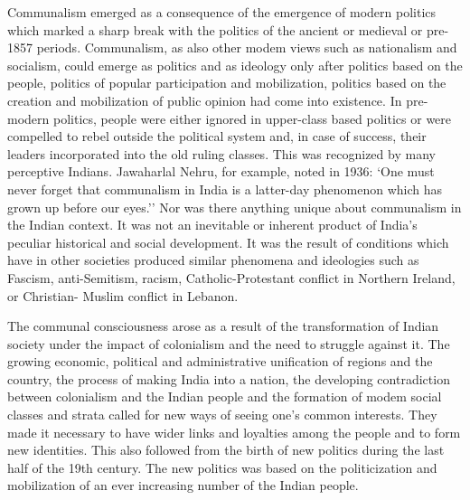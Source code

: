 \begin{multicols}{2}
Communalism emerged as a consequence of the emergence of modern politics which marked a sharp break with the politics of the ancient or medieval or pre-1857 periods. Communalism, as also other modem views such as nationalism and socialism, could emerge as politics and as ideology only after politics based on the people, politics of popular participation and mobilization, politics based on the creation and mobilization of public opinion had come into existence. In pre-modern politics, people were either ignored in upper-class based politics or were compelled to rebel outside the political system and, in case of success, their leaders incorporated into the old ruling classes. This was recognized by many perceptive Indians. Jawaharlal Nehru, for example, noted in 1936: `One must never forget that communalism in India is a latter-day phenomenon which has grown up before our eyes.'' Nor was there anything unique about communalism in the Indian context. It was not an inevitable or inherent product of India's peculiar historical and social development. It was the result of conditions which have in other societies produced similar phenomena and ideologies such as Fascism, anti-Semitism, racism, Catholic-Protestant conflict in Northern Ireland, or Christian- Muslim conflict in Lebanon. 

The communal consciousness arose as a result of the transformation of Indian society under the impact of colonialism and the need to struggle against it. The growing economic, political and administrative unification of regions and the country, the process of making India into a nation, the developing contradiction between colonialism and the Indian people and the formation of modem social classes and strata called for new ways of seeing one's common interests. They made it necessary to have wider links and loyalties among the people and to form new identities. This also followed from the birth of new politics during the last half of the 19th century. The new politics was based on the politicization and mobilization of an ever increasing number of the Indian people. 


\end{multicols}
